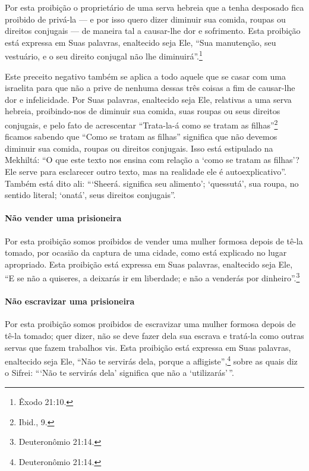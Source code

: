 Por esta proibição o proprietário de uma serva hebreia que a tenha
desposado fica proibido de privá-la --- e por isso quero dizer diminuir
sua comida, roupas ou direitos conjugais --- de maneira tal a
causar-lhe dor e sofrimento. Esta proibição está expressa em Suas
palavras, enaltecido seja Ele, ``Sua manutenção, seu vestuário, e o seu
direito conjugal não lhe diminuirá''.\footnote{Êxodo 21:10.}

Este preceito negativo também se aplica a todo aquele que se casar com
uma israelita para que não a prive de nenhuma dessas três coisas a fim
de causar-lhe dor e infelicidade. Por Suas palavras, enaltecido seja Ele,
relativas a uma serva hebreia, proibindo-nos de diminuir sua comida,
suas roupas ou seus direitos conjugais, e pelo fato de acrescentar
``Trata-la-á como se tratam as filhas''\footnote{Ibid., 9.} ficamos sabendo que
``Como se tratam as filhas'' significa que não devemos diminuir sua
comida, roupas ou direitos conjugais. Isso está estipulado na Mekhiltá:
``O que este texto nos ensina com relação a `como se tratam as filhas'?
Ele serve para esclarecer outro texto, mas na realidade ele é
autoexplicativo''. Também está dito ali: ```Sheerá.
significa seu alimento'; `quessutá', sua roupa, no sentido literal;
`onatá', seus direitos conjugais''.

\paragraph{Não vender uma prisioneira}

Por esta proibição somos proibidos de vender uma mulher formosa depois
de tê-la tomado, por ocasião da captura de uma cidade, como está
explicado no lugar apropriado. Esta proibição está expressa em Suas
palavras, enaltecido seja Ele, ``E se não a quiseres, a deixarás ir em
liberdade; e não a venderás por dinheiro''.\footnote{Deuteronômio 21:14.}

\paragraph{Não escravizar uma prisioneira}

Por esta proibição somos proibidos de escravizar uma mulher formosa
depois de tê-la tomado; quer dizer, não se deve fazer dela sua escrava e
tratá-la como outras servas que fazem trabalhos vis. Esta proibição está
expressa em Suas palavras, enaltecido seja Ele, ``Não te servirás dela,
porque a afligiste'',\footnote{Deuteronômio 21:14.} sobre as quais diz o Sifrei:
```Não te servirás dela' significa que não a `utilizarás'\,''.

